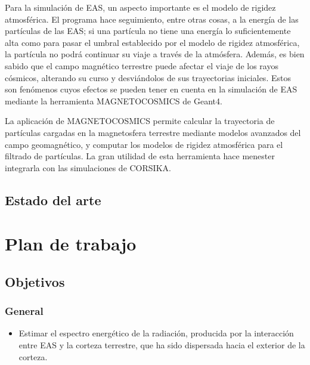 \documentclass[12pt]{report}
\begin{document}
Para la simulación de EAS, un aspecto importante es el modelo de rigidez atmosférica. El programa hace seguimiento, entre otras cosas, a la energía de las partículas de las EAS; si una partícula no tiene una energía lo suficientemente alta como para pasar el umbral establecido por el modelo de rigidez atmosférica, la partícula no podrá continuar su viaje a través de la atmósfera. Además, es bien sabido que el campo magnético terrestre puede afectar el viaje de los rayos cósmicos, alterando su curso y desviándolos de sus trayectorias iniciales. Estos son fenómenos cuyos efectos se pueden tener en cuenta en la simulación de EAS mediante la herramienta MAGNETOCOSMICS de Geant4.

La aplicación de MAGNETOCOSMICS permite calcular la trayectoria de partículas cargadas en la magnetosfera terrestre mediante modelos avanzados del campo geomagnético, y computar los modelos de rigidez atmosférica para el filtrado de partículas. \cite{magnetocosmics} La gran utilidad de esta herramienta hace menester integrarla con las simulaciones de CORSIKA.



\subsection*{Estado del arte}










\section*{Plan de trabajo}

\subsection*{Objetivos}

\subsubsection*{General}
\begin{itemize}
    \item Estimar el espectro energético de la radiación, producida por la interacción entre EAS y la corteza terrestre, que ha sido dispersada hacia el exterior de la corteza.
\end{itemize}
\end{document}
